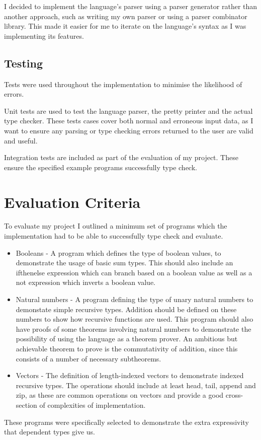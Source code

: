 \documentclass[12pt,a4paper,twoside]{report}
\begin{document}
I decided to implement the language's parser using a parser generator rather than another approach, such as writing my own parser or using a parser combinator library.
This made it easier for me to iterate on the language's syntax as I was implementing its features.

\subsection{Testing}

Tests were used throughout the implementation to minimise the likelihood of errors.

Unit tests are used to test the language parser, the pretty printer and the actual type checker.
These tests cases cover both normal and erroneous input data, as I want to ensure any parsing or type checking errors returned to the user are valid and useful.

Integration tests are included as part of the evaluation of my project.
These ensure the specified example programs successfully type check.

\section{Evaluation Criteria}
To evaluate my project I outlined a minimum set of programs which the implementation had to be able to successfully type check and evaluate.
\begin{itemize}
    \item Booleans - A program which defines the type of boolean values, to demonstrate the usage of basic sum types.
    This should also include an ifthenelse expression which can branch based on a boolean value as well as a not expression which inverts a boolean value.
    \item Natural numbers - A program defining the type of unary natural numbers to demonstate simple recursive types.
    Addition should be defined on these numbers to show how recursive functions are used.
    This program should also have proofs of some theorems involving natural numbers to demonstrate the possibility of using the language as a theorem prover.
    An ambitious but achievable theorem to prove is the commutativity of addition, since this consists of a number of necessary subtheorems.
    \item Vectors - The definition of length-indexed vectors to demonstrate indexed recursive types.
    The operations should include at least head, tail, append and zip, as these are common operations on vectors and provide a good cross-section of complexities of implementation.
\end{itemize}
These programs were specifically selected to demonstrate the extra expressivity that dependent types give us.
\end{document}
